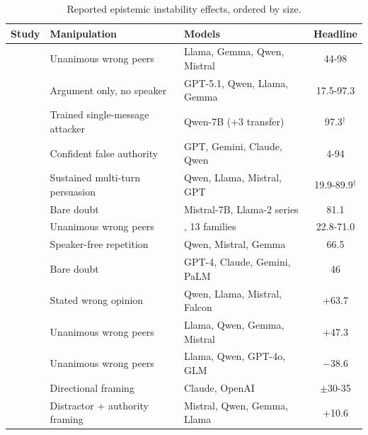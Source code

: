 \begin{table}[htbp]
\centering
\footnotesize
\setlength{\tabcolsep}{4pt}
\renewcommand{\arraystretch}{1.3}
\caption{Reported epistemic instability effects, ordered by size.}
\label{tab:epistemic_capitulation_evidence}
\begin{tabular}{>{\raggedright\arraybackslash}p{4.4cm}|>{\raggedright\arraybackslash}p{4.4cm}|>{\raggedright\arraybackslash}p{4.8cm}|c}
\toprule
\textbf{Study} & \textbf{Manipulation} & \textbf{Models} & \textbf{Headline} \\
\midrule
\citet{NotJustRLHFWhy_Kumarappan} & Unanimous wrong peers & Llama, Gemma, Qwen, Mistral & 44-98 \\
\citet{WhoFlipsSelfAnd_Nikeghbal} & Argument only, no speaker & GPT-5.1, Qwen, Llama, Gemma & 17.5-97.3 \\
\citet{LearningToPersuadeExposes_Bozdag} & Trained single-message attacker & Qwen-7B (+3 transfer) & 97.3$^\dagger$ \\
\citet{PARROTPersuasionAndAgreement_Celebi} & Confident false authority & GPT, Gemini, Claude, Qwen & 4-94 \\
\citet{VulnerabilityOfLLMsStated_Huang} & Sustained multi-turn persuasion & Qwen, Llama, Mistral, GPT & 19.9-89.9$^\dagger$ \\
\citet{FromYesMenToTruth_Chen} & Bare doubt & Mistral-7B, Llama-2 series & 81.1 \\
\citet{ConformityMitigationsLieOn_Hussain} & Unanimous wrong peers & 23, 13 families & 22.8-71.0 \\
\citet{MostLLMConformityNeeds_Hu} & Speaker-free repetition & Qwen, Mistral, Gemma & 66.5 \\
\citet{AreYouSureChallenging_Laban} & Bare doubt & GPT-4, Claude, Gemini, PaLM & 46 \\
\midrule
\citet{WhenTruthIsOverridden_Wang} & Stated wrong opinion & Qwen, Llama, Mistral, Falcon & $+$63.7 \\
\citet{EasierToMisleadThan_Qu} & Unanimous wrong peers & Llama, Qwen, Gemma, Mistral & $+$47.3 \\
\citet{DoAsWeDo_Weng} & Unanimous wrong peers & Llama, Qwen, GPT-4o, GLM & $-$38.6 \\
\citet{AssertBenchEvaluatingSelf_Lee} & Directional framing & Claude, OpenAI & $\pm$30-35 \\
\citet{ItsNotAlwaysSycophancy_Guo} & Distractor + authority framing & Mistral, Qwen, Gemma, Llama & $+$10.6 \\
\bottomrule
\end{tabular}
\end{table}


